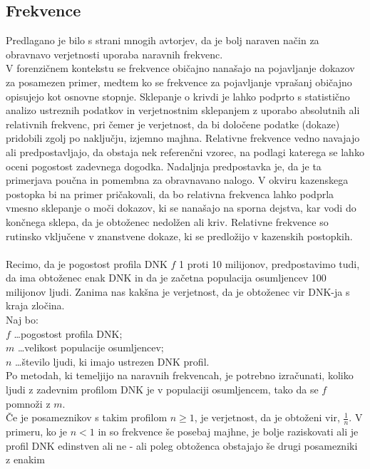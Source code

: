 \documentclass[12pt,a4paper]{amsart}
\theoremstyle{definition} %
\theoremstyle{plain} %
\begin{document}
\subsection{Frekvence}
Predlagano je bilo s strani mnogih avtorjev, da je bolj naraven način za obravnavo verjetnosti uporaba naravnih frekvenc.\\
V forenzičnem kontekstu se frekvence običajno nanašajo na pojavljanje dokazov za posamezen primer, medtem ko se frekvence za
pojavljanje vprašanj običajno opisujejo kot osnovne stopnje. Sklepanje o krivdi je lahko podprto s statistično analizo
ustreznih podatkov in verjetnostnim sklepanjem z uporabo absolutnih ali relativnih frekvenc, pri čemer je verjetnost, da bi določene
podatke (dokaze) pridobili zgolj po naključju, izjemno majhna. Relativne frekvence vedno navajajo ali predpostavljajo, da obstaja nek
referenčni vzorec, na podlagi katerega se lahko oceni pogostost zadevnega dogodka. Nadaljnja predpostavka je, da je ta primerjava poučna
in pomembna za obravnavano nalogo. V okviru kazenskega postopka bi na primer pričakovali, da bo relativna frekvenca lahko podprla
vmesno sklepanje o moči dokazov, ki se nanašajo na sporna dejstva, kar vodi do končnega sklepa, da je obtoženec nedolžen ali kriv. Relativne
frekvence so rutinsko vključene v znanstvene dokaze, ki se predložijo v kazenskih postopkih.\\\\
Recimo, da je pogostost profila DNK $f$ 1 proti 10 milijonov, predpostavimo tudi, da ima obtoženec enak DNK in da je začetna populacija osumljencev
100 milijonov ljudi. Zanima nas kakšna je verjetnost, da je obtoženec vir DNK-ja s kraja zločina. \\
Naj bo: \\
$f$ \dots pogostost profila DNK;\\
$m$ \dots velikost populacije osumljencev; \\
$n$ \dots število ljudi, ki imajo ustrezen DNK profil. \\
Po metodah, ki temeljijo na naravnih frekvencah, je potrebno izračunati, koliko ljudi z zadevnim profilom DNK je v populaciji osumljencem, tako
da se $f$ pomnoži z $m$.  \\
Če je posameznikov s takim profilom $n \ge 1$, je verjetnost, da je obtoženi vir, $\frac{1}{n}$. V primeru, ko je $n < 1$ in so frekvence še
posebaj majhne, je bolje raziskovati ali je profil DNK edinstven ali ne - ali poleg obtoženca obstajajo še drugi posamezniki z enakim
\end{document}
